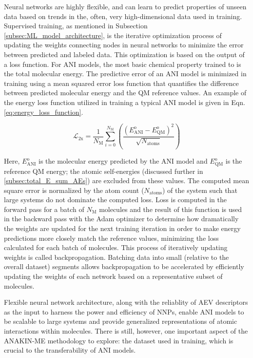 Neural networks are highly flexible, and can learn to predict properties of unseen data based on trends in the, often, very high-dimensional data used in training.
Supervised training, as mentioned in Subsection \ref{subsec:ML_model_architecture}, is the iterative optimization process of updating the weights connecting nodes in neural networks to minimize the error between predicted and labeled data.
This optimization is based on the output of a loss function.
For ANI models, the most basic chemical property trained to is the total molecular energy.
The predictive error of an ANI model is minimized in training using a mean squared error loss function that quantifies the difference between predicted molecular energy and the QM reference values.
An example of the energy loss function utilized in training a typical ANI model is given in Eqn. \ref{eq:energy_loss_function}.

\begin{equation}
    \mathcal{L}_{2\text{x}} =
    \frac{1}{N_{\text{M}}} 
    \sum_{i=0}^{N_{\text{M}}} 
    \left( \frac{ \left( E_{\text{ANI}}^\text{o} - E_{\text{QM}}^\text{o} \right)^2}
    {\sqrt{N_{\text{atoms}}}} \right)
    \label{eq:energy_loss_function}
\end{equation}

Here, $E_{\text{ANI}}^\text{o}$ is the molecular energy predicted by the ANI model and $E_{\text{QM}}^\text{o}$ is the reference QM energy; the atomic self-energies (discussed further in \ref{subsec:total_E_sum_AEs}) are excluded from these values.
The computed mean square error is normalized by the atom count ($N_{\text{atoms}}$) of the system such that large systems do not dominate the computed loss.
Loss is computed in the forward pass for a batch of $N_{\text{M}}$ molecules and the result of this function is used in the backward pass with the Adam optimizer \cite{adam_optim} to determine how dramatically the weights are updated for the next training iteration in order to make energy predictions more closely match the reference values, minimizing the loss calculated for each batch of molecules. 
This process of iteratively updating weights is called backpropagation.
Batching data into small (relative to the overall dataset) segments allows backpropagation to be accelerated by efficiently updating the weights of each network based on a representative subset of molecules. 

Flexible neural network architecture, along with the reliablity of AEV descriptors as the input to harness the power and efficiency of NNPs, enable ANI models to be scalable to large systems and provide generalized representations of atomic interactions within molecules.
There is still, however, one important aspect of the ANAKIN-ME methodology to explore: the dataset used in training, which is crucial to the transferability of ANI models.


